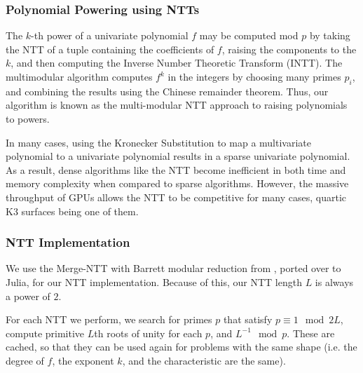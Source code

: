 \subsubsection{Polynomial Powering using NTTs}
The \(k\)-th power of a univariate polynomial \(f\)
may be computed mod \(p\) by taking the NTT 
of a tuple containing the coefficients of \(f\),
raising the components to the \(k\),
and then computing the Inverse Number Theoretic Transform (INTT).
The multimodular algorithm 
computes \(f^{k}\) in the integers by
choosing many primes \(p_{i}\), 
and combining the results using the Chinese remainder theorem.
Thus, our algorithm is known as the 
multi-modular NTT approach to raising polynomials to powers.

In many cases, using the Kronecker Substitution to 
map a multivariate polynomial to a univariate polynomial results in 
a sparse univariate polynomial. As a result, dense 
algorithms like the NTT become inefficient in both 
time and memory complexity when compared to sparse algorithms.
However, the massive throughput of GPUs allows the 
NTT to be competitive for many cases, 
quartic K3 surfaces being one of them.

\subsubsection{NTT Implementation}

We use the Merge-NTT with Barrett modular reduction from \cite{ozcan-2023-fft}, ported over to Julia, for our NTT implementation. 
Because of this, our NTT length $L$ is always a power of $2$. 

For each NTT we perform, we search for primes $p$ that satisfy 
$p \equiv 1 \mod 2L$, compute primitive $L$th roots of unity 
for each $p$, and $L^{-1} \mod p$. 
These are cached, so that they can be used again for problems with the same shape 
(i.e. the degree of \(f\), the exponent \(k\), and the characteristic are the same).


